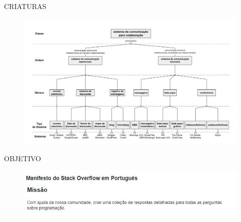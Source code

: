 \documentclass{Alexandre}
\begin{document}
\begin{frame}{CRIATURAS}

    \begin{figure}
        \includegraphics[scale = 0.27]{Figuras/FerrametasColaborativas.jpg}
    \end{figure}

\end{frame}


\begin{frame}{OBJETIVO}

    \begin{figure}
        \includegraphics[scale = 0.6]{Figuras/Manifesto-StackOverflow.jpg}
    \end{figure}

\end{frame}
\end{document}
